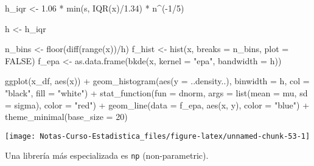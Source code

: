 \documentclass[
  12pt,
]{book}
\newenvironment{Shaded}{\begin{snugshade}}{\end{snugshade}}
\newcommand{\AttributeTok}[1]{\textcolor[rgb]{0.77,0.63,0.00}{#1}}
\newcommand{\ConstantTok}[1]{\textcolor[rgb]{0.00,0.00,0.00}{#1}}
\newcommand{\DecValTok}[1]{\textcolor[rgb]{0.00,0.00,0.81}{#1}}
\newcommand{\FloatTok}[1]{\textcolor[rgb]{0.00,0.00,0.81}{#1}}
\newcommand{\FunctionTok}[1]{\textcolor[rgb]{0.00,0.00,0.00}{#1}}
\newcommand{\NormalTok}[1]{#1}
\newcommand{\OtherTok}[1]{\textcolor[rgb]{0.56,0.35,0.01}{#1}}
\newcommand{\SpecialCharTok}[1]{\textcolor[rgb]{0.00,0.00,0.00}{#1}}
\newcommand{\StringTok}[1]{\textcolor[rgb]{0.31,0.60,0.02}{#1}}
\theoremstyle{definition}
\theoremstyle{definition}
\theoremstyle{definition}
\theoremstyle{definition}
\theoremstyle{remark}
\begin{document}
\begin{Shaded}
\begin{Highlighting}[]
\NormalTok{h\_iqr }\OtherTok{\textless{}{-}} \FloatTok{1.06} \SpecialCharTok{*} \FunctionTok{min}\NormalTok{(s, }\FunctionTok{IQR}\NormalTok{(x)}\SpecialCharTok{/}\FloatTok{1.34}\NormalTok{) }\SpecialCharTok{*}\NormalTok{ n}\SpecialCharTok{\^{}}\NormalTok{(}\SpecialCharTok{{-}}\DecValTok{1}\SpecialCharTok{/}\DecValTok{5}\NormalTok{)}

\NormalTok{h }\OtherTok{\textless{}{-}}\NormalTok{ h\_iqr}

\NormalTok{n\_bins }\OtherTok{\textless{}{-}} \FunctionTok{floor}\NormalTok{(}\FunctionTok{diff}\NormalTok{(}\FunctionTok{range}\NormalTok{(x))}\SpecialCharTok{/}\NormalTok{h)}
\NormalTok{f\_hist }\OtherTok{\textless{}{-}} \FunctionTok{hist}\NormalTok{(x, }\AttributeTok{breaks =}\NormalTok{ n\_bins, }\AttributeTok{plot =} \ConstantTok{FALSE}\NormalTok{)}
\NormalTok{f\_epa }\OtherTok{\textless{}{-}} \FunctionTok{as.data.frame}\NormalTok{(}\FunctionTok{bkde}\NormalTok{(x, }\AttributeTok{kernel =} \StringTok{"epa"}\NormalTok{, }\AttributeTok{bandwidth =}\NormalTok{ h))}

\FunctionTok{ggplot}\NormalTok{(x\_df, }\FunctionTok{aes}\NormalTok{(x)) }\SpecialCharTok{+} \FunctionTok{geom\_histogram}\NormalTok{(}\FunctionTok{aes}\NormalTok{(}\AttributeTok{y =}\NormalTok{ ..density..),}
    \AttributeTok{binwidth =}\NormalTok{ h, }\AttributeTok{col =} \StringTok{"black"}\NormalTok{, }\AttributeTok{fill =} \StringTok{"white"}\NormalTok{) }\SpecialCharTok{+}
    \FunctionTok{stat\_function}\NormalTok{(}\AttributeTok{fun =}\NormalTok{ dnorm, }\AttributeTok{args =} \FunctionTok{list}\NormalTok{(}\AttributeTok{mean =}\NormalTok{ mu,}
        \AttributeTok{sd =}\NormalTok{ sigma), }\AttributeTok{color =} \StringTok{"red"}\NormalTok{) }\SpecialCharTok{+} \FunctionTok{geom\_line}\NormalTok{(}\AttributeTok{data =}\NormalTok{ f\_epa,}
    \FunctionTok{aes}\NormalTok{(x, y), }\AttributeTok{color =} \StringTok{"blue"}\NormalTok{) }\SpecialCharTok{+} \FunctionTok{theme\_minimal}\NormalTok{(}\AttributeTok{base\_size =} \DecValTok{20}\NormalTok{)}
\end{Highlighting}
\end{Shaded}

\begin{center}\texttt{[image: Notas-Curso-Estadistica\_files/figure-latex/unnamed-chunk-53-1]} \end{center}

Una librería más especializada es \texttt{np} (non-parametric).
\end{document}
